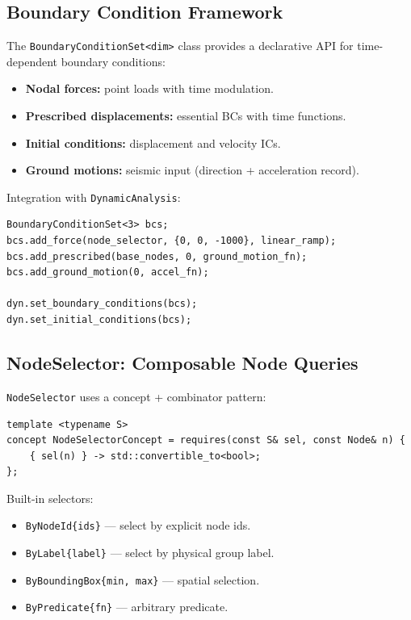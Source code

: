 \subsection{Boundary Condition Framework}
\label{sec:arch:model:bc}

The \texttt{BoundaryConditionSet<dim>} class provides a declarative API
for time-dependent boundary conditions:

\begin{itemize}[nosep]
  \item \textbf{Nodal forces:} point loads with time modulation.
  \item \textbf{Prescribed displacements:} essential BCs with time functions.
  \item \textbf{Initial conditions:} displacement and velocity ICs.
  \item \textbf{Ground motions:} seismic input (direction + acceleration record).
\end{itemize}

\noindent
Integration with \texttt{DynamicAnalysis}:

\begin{verbatim}
BoundaryConditionSet<3> bcs;
bcs.add_force(node_selector, {0, 0, -1000}, linear_ramp);
bcs.add_prescribed(base_nodes, 0, ground_motion_fn);
bcs.add_ground_motion(0, accel_fn);

dyn.set_boundary_conditions(bcs);
dyn.set_initial_conditions(bcs);
\end{verbatim}


\subsection{NodeSelector: Composable Node Queries}
\label{sec:arch:model:selector}

\texttt{NodeSelector} uses a concept + combinator pattern:

\begin{verbatim}
template <typename S>
concept NodeSelectorConcept = requires(const S& sel, const Node& n) {
    { sel(n) } -> std::convertible_to<bool>;
};
\end{verbatim}

Built-in selectors:
\begin{itemize}[nosep]
  \item \texttt{ByNodeId\{ids\}} --- select by explicit node ids.
  \item \texttt{ByLabel\{label\}} --- select by physical group label.
  \item \texttt{ByBoundingBox\{min, max\}} --- spatial selection.
  \item \texttt{ByPredicate\{fn\}} --- arbitrary predicate.
\end{itemize}

